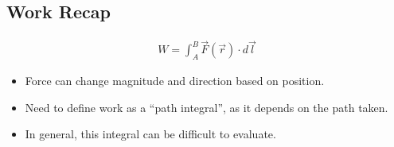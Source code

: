 \documentclass[aspectratio=169,
hyperref={colorlinks,urlcolor=blue}
]{beamer}
\begin{document}




\subsection{Work Recap}
\label{subsec:workrecap}
{
\begin{align*}
W=\int_A^B \vec F(\vec r) \cdot d\vec l
\end{align*}
\begin{itemize}
\item Force can change magnitude and direction based on position.
\item Need to define work as a ``path integral'', as it depends on the path taken.
\item In general, this integral can be difficult to evaluate.
\end{itemize}
}
\end{document}
